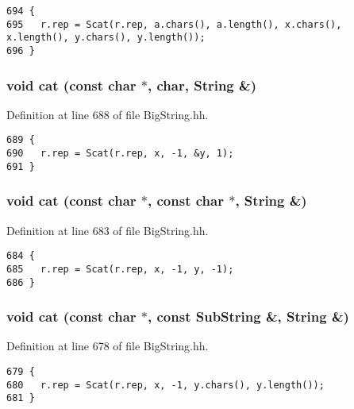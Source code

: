 \footnotesize\begin{verbatim}694 {
695   r.rep = Scat(r.rep, a.chars(), a.length(), x.chars(), x.length(), y.chars(), y.length());
696 }
\end{verbatim}\normalsize 
{}
\subsubsection{\setlength{\rightskip}{0pt plus 5cm}void cat (const char $\ast$, char, String \&)\hspace{0.3cm}{\tt  [friend]}}\label{classString_l12}




Definition at line 688 of file Big\-String.hh.



\footnotesize\begin{verbatim}689 {
690   r.rep = Scat(r.rep, x, -1, &y, 1);
691 }
\end{verbatim}\normalsize 
{}
\subsubsection{\setlength{\rightskip}{0pt plus 5cm}void cat (const char $\ast$, const char $\ast$, String \&)\hspace{0.3cm}{\tt  [friend]}}\label{classString_l11}




Definition at line 683 of file Big\-String.hh.



\footnotesize\begin{verbatim}684 {
685   r.rep = Scat(r.rep, x, -1, y, -1);
686 }
\end{verbatim}\normalsize 
{}
\subsubsection{\setlength{\rightskip}{0pt plus 5cm}void cat (const char $\ast$, const {\bf Sub\-String} \&, String \&)\hspace{0.3cm}{\tt  [friend]}}\label{classString_l10}




Definition at line 678 of file Big\-String.hh.



\footnotesize\begin{verbatim}679 {
680   r.rep = Scat(r.rep, x, -1, y.chars(), y.length());
681 }
\end{verbatim}\normalsize 
{}
